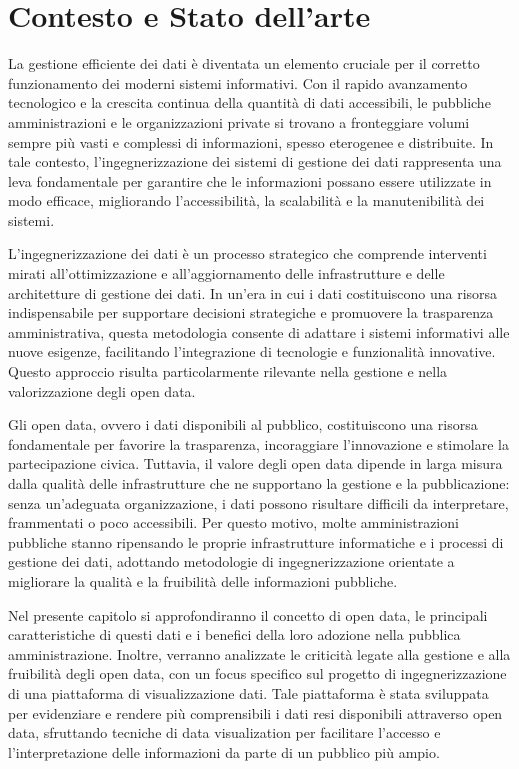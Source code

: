 \clearpage{\pagestyle{empty}\cleardoublepage}
\chapter{Contesto e Stato dell'arte}                %
\lhead[\fancyplain{}{\bfseries\thepage}]{\fancyplain{}{\bfseries\rightmark}}
La gestione efficiente dei dati è diventata un elemento cruciale per il corretto funzionamento dei moderni sistemi informativi. Con il rapido avanzamento tecnologico e la crescita continua della quantità di dati accessibili, le pubbliche amministrazioni e le organizzazioni private si trovano a fronteggiare volumi sempre più vasti e complessi di informazioni, spesso eterogenee e distribuite. In tale contesto, l’ingegnerizzazione dei sistemi di gestione dei dati rappresenta una leva fondamentale per garantire che le informazioni possano essere utilizzate in modo efficace, migliorando l’accessibilità, la scalabilità e la manutenibilità dei sistemi.

L’ingegnerizzazione dei dati è un processo strategico che comprende interventi mirati all’ottimizzazione e all’aggiornamento delle infrastrutture e delle architetture di gestione dei dati. In un’era in cui i dati costituiscono una risorsa indispensabile per supportare decisioni strategiche e promuovere la trasparenza amministrativa, questa metodologia consente di adattare i sistemi informativi alle nuove esigenze, facilitando l’integrazione di tecnologie e funzionalità innovative. Questo approccio risulta particolarmente rilevante nella gestione e nella valorizzazione degli open data.

Gli open data, ovvero i dati disponibili al pubblico, costituiscono una risorsa fondamentale per favorire la trasparenza, incoraggiare l’innovazione e stimolare la partecipazione civica.
Tuttavia, il valore degli open data dipende in larga misura dalla qualità delle infrastrutture che ne supportano la gestione e la pubblicazione: senza un’adeguata organizzazione, i dati possono risultare difficili da interpretare, frammentati o poco accessibili. Per questo motivo, molte amministrazioni pubbliche stanno ripensando le proprie infrastrutture informatiche e i processi di gestione dei dati, adottando metodologie di ingegnerizzazione orientate a migliorare la qualità e la fruibilità delle informazioni pubbliche.

Nel presente capitolo si approfondiranno il concetto di open data, le principali caratteristiche di questi dati e i benefici della loro adozione nella pubblica amministrazione. Inoltre, verranno analizzate le criticità legate alla gestione e alla fruibilità degli open data, con un focus specifico sul progetto di ingegnerizzazione di una piattaforma di visualizzazione dati. Tale piattaforma è stata sviluppata per evidenziare e rendere più comprensibili i dati resi disponibili attraverso open data, sfruttando tecniche di data visualization per facilitare l’accesso e l’interpretazione delle informazioni da parte di un pubblico più ampio.

